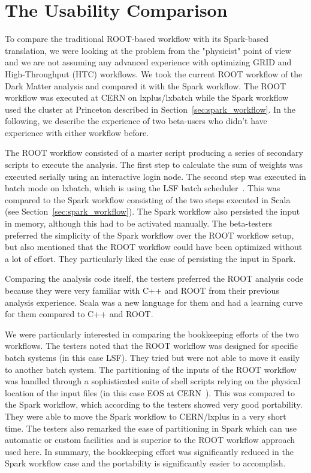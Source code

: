 \documentclass[a4paper]{jpconf}
\begin{document}
\section{The Usability Comparison}

To compare the traditional ROOT-based workflow with its Spark-based translation, we were looking at the problem from the  "physicist" point of view and we are not assuming any advanced experience with optimizing GRID and High-Throughput (HTC) workflows. We took the current ROOT workflow of the Dark Matter analysis and compared it with the Spark workflow. The ROOT workflow was executed at CERN on lxplus/lxbatch while the Spark workflow used the cluster at Princeton described in Section~\ref{sec:spark_workflow}. In the following, we describe the experience of two beta-users who didn't have experience with either workflow before.

The ROOT workflow consisted of a master script producing a series of secondary scripts to execute the analysis. The first step to calculate the sum of weights was executed serially using an interactive login node. The second step was executed in batch mode on lxbatch, which is using the LSF batch scheduler~\cite{lsf}. This was compared to the Spark workflow consisting of the two steps executed in Scala (see Section~\ref{sec:spark_workflow}). The Spark workflow also persisted the input in memory, although this had to be activated manually. The beta-testers preferred the simplicity of the Spark workflow over the ROOT workflow setup, but also mentioned that the ROOT workflow could have been optimized without a lot of effort. They particularly liked the ease of persisting the input in Spark.

Comparing the analysis code itself, the testers preferred the ROOT analysis code because they were very familiar with C++ and ROOT from their previous analysis experience. Scala was a new language for them and had a learning curve for them compared to C++ and ROOT.

We were particularly interested in comparing the bookkeeping efforts of the two workflows. The testers noted that the ROOT workflow was designed for specific batch systems (in this case LSF). They tried but were not able to move it easily to another batch system. The partitioning of the inputs of the ROOT workflow was handled through a sophisticated suite of shell scripts relying on the physical location of the input files (in this case EOS at CERN~\cite{eos}). This was compared to the Spark workflow, which according to the testers showed very good portability. They were able to move the Spark workflow to CERN/lxplus in a very short time. The testers also remarked the ease of partitioning in Spark which can use automatic or custom facilities and is superior to the ROOT workflow approach used here. In summary, the bookkeeping effort was significantly reduced in the Spark workflow case and the portability is significantly easier to accomplish.
\end{document}
